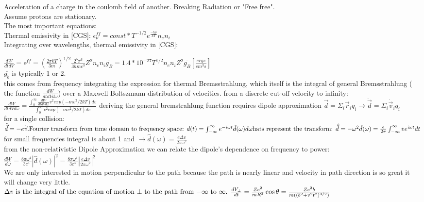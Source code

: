 \documentclass[12pt]{report}
\begin{document}
Acceleration of a charge in the coulomb field of another. Breaking Radiation or "Free free".\\
Assume protons are stationary.\\
The most important equations:\\
Thermal emissivity in [CGS]: \( \boxed{\epsilon_\nu^{ff}=const*T^{-1/2}e^{\frac{-h\nu}{kT}}n_en_i}\)\\

Integrating over wavelengths, thermal emissivity in [CGS]: 

\( \boxed{\frac{dW}{dtdV}=\epsilon^{ff}=(\frac{2\pi kT}{3m})^{1/2}\frac{2^5\pi^6}{3hmc^3}Z^2n_en_i\bar{g_B}=1.4*10^{-27}T^{1/2}n_e n_i Z^2\bar{g_B}} [\frac{ergs}{cm^3s}]\)\\
$\bar{g_b}$ is typically 1 or 2.\\
this comes from frequency integrating the expression for thermal Bremsstrahlung, which itself is the integral of general Bremsstrahlung ( the function $ \frac{dW}{dtdVd\omega}$) over a Maxwell Boltszmann distribution of velocities. from a discrete cut-off velocity to infinity:\\
\(\frac{dW}{dtdVd\omega}=\frac{\int_0^\infty \frac{dW}{dtdVd\omega}v^2exp(-mv^2/2kT)dv}{\int_0^\infty v^2exp(-mv^2/2kT)dv}\)
deriving the general bremstrahlung function requires dipole approximation $\vec{d}=\Sigma_i\vec{r}_iq_i\rightarrow \ddot{\vec{d}}=\Sigma_i\dot{\vec{v}}_iq_i$\\
for a single collision:\( \ddot{\vec{d}}=-e\dot{\vec{v}}$.\\
Fourier transform from time domain to frequency space: $d(t)=\int_{-\infty}^\infty e^{-i\omega t}\hat{d}(\omega)d\omega$\\
hats represent the transform: \(\hat{\ddot{d}}=-\omega^2\hat{d}(\omega)=\frac{e}{2\pi}\int_{-\infty}^{\infty}\dot{v}e^{i\omega t}dt\)
for small frequencies integral is about 1 and \(\rightarrow \hat{d}(\omega)=\frac{e\Delta v}{2\pi \omega^2}\) \\
from the non-relativistic Dipole Approximation we can relate the dipole's dependence on frequency to power: \(\frac{dW}{d\omega}=\frac{8\pi \omega^4}{3c^3}|\hat{d}(\omega)|^2=\frac{8\pi \omega^4}{3c^3}|\frac{e\Delta v}{2\pi \omega^2}|^2\)\\
We are only interested in motion perpendicular to the path because the path is nearly linear and velocity in path direction is so great it will change very little. \\
\(\Delta v$ is the integral of the equation of motion $\perp$ to the path from $-\infty$ to $\infty$. \(\frac{d V_\perp}{d t} =\frac{Ze^2}{mR^2}\cos\theta=\frac{Ze^2b}{m((b^2+v^2t^2)^{3/2})}\)\\
\end{document}
